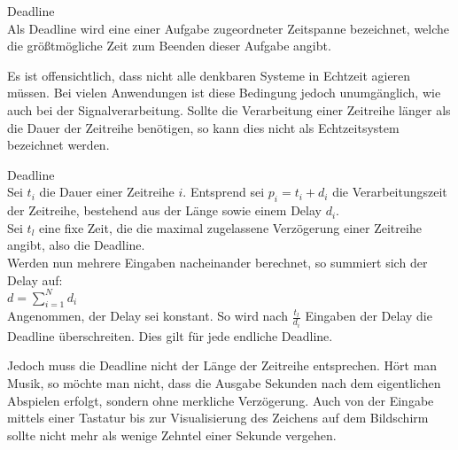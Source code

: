 \begin{definition}{Deadline}\\
Als Deadline wird eine einer Aufgabe zugeordneter Zeitspanne bezeichnet, welche die größtmögliche Zeit zum Beenden dieser Aufgabe angibt.
\end{definition}

Es ist offensichtlich, dass nicht alle denkbaren Systeme in Echtzeit agieren müssen. Bei vielen Anwendungen ist diese Bedingung jedoch unumgänglich, wie auch bei der Signalverarbeitung. Sollte die Verarbeitung einer Zeitreihe länger als die Dauer der Zeitreihe benötigen, so kann dies nicht als Echtzeitsystem bezeichnet werden.\\

\begin{bew}{Deadline}\\
Sei $t_i$ die Dauer einer Zeitreihe $i$. Entsprend sei $p_i = t_i + d_i$ die Verarbeitungszeit der Zeitreihe, bestehend aus der Länge sowie einem Delay $d_i$.\\
Sei $t_l$ eine fixe Zeit, die die maximal zugelassene Verzögerung einer Zeitreihe angibt, also die Deadline.\\
Werden nun mehrere Eingaben nacheinander berechnet, so summiert sich der Delay auf:\\
$d = \sum_{i=1}^N d_i$\\
Angenommen, der Delay sei konstant. So wird nach $\frac{t_l}{d_i}$ Eingaben der Delay die Deadline überschreiten. Dies gilt für jede endliche Deadline.
\end{bew}
Jedoch muss die Deadline nicht der Länge der Zeitreihe entsprechen. Hört man Musik, so möchte man nicht, dass die Ausgabe Sekunden nach dem eigentlichen Abspielen erfolgt, sondern ohne merkliche Verzögerung. Auch von der Eingabe mittels einer Tastatur bis zur Visualisierung des Zeichens auf dem Bildschirm sollte nicht mehr als wenige Zehntel einer Sekunde vergehen.

